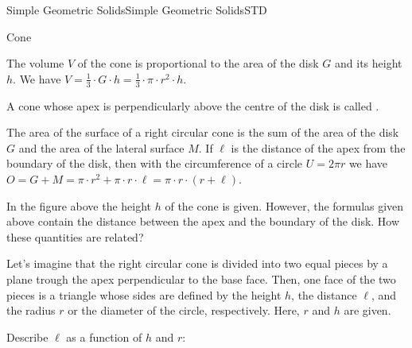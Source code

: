 \begin{MXContent}{Simple Geometric Solids}{Simple Geometric Solids}{STD}
\begin{MXInfo}{Cone}
\begin{center}
{
}
\end{center}

The volume $V$ of the cone is proportional to the area of the disk $G$ and 
its height $h$. We have $V = \frac{1}{3} \cdot G \cdot h %
 = \frac{1}{3} \cdot \pi \cdot r^2 \cdot h$.

A cone whose apex is perpendicularly above the centre of the disk is called 
.

The area of the surface of a right circular cone is the sum of the 
area of the disk $G$ and the area of the lateral surface $M$. If $\ell$
is the distance of the apex from the boundary of the disk, then with the 
circumference of a circle $U =  2 \pi r$ we have
$O = G + M = \pi \cdot r^2 + \pi \cdot r \cdot \ell %
 = \pi \cdot r \cdot (r + \ell)$.
\end{MXInfo}

In the figure above the height $h$ of the cone is given. However, 
the formulas given above contain the distance between the apex and 
the boundary of the disk. How these quantities are related?

\begin{MExercise}
Let's imagine that the right circular cone is divided into two equal pieces by a plane 
trough the apex perpendicular to the base face. Then, one face of the two pieces is a triangle
whose sides are defined by the height $h$, the distance $\ell$, and the radius $r$ or the diameter of 
the circle, respectively. Here, $r$ and $h$ are given.

\begin{MExerciseItems}
\item
Describe $\ell$ as a function of $h$ and $r$:
\par
{}


\end{MExerciseItems}
\end{MExercise}
\end{MXContent}
